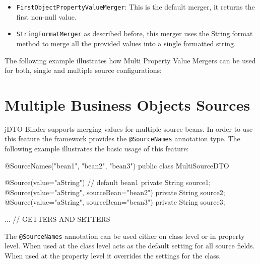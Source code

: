 \documentclass[11pt]{article}
\newcommand{\JDTO}{jDTO Binder\xspace}
\begin{document}
\begin{itemize}
 \item \texttt{FirstObjectPropertyValueMerger}: This is the default merger, it returns the first non-null value.
 \item \texttt{StringFormatMerger} as described before, this merger uses the String.format method to merge all the provided values into a single formatted string.
\end{itemize}


The following example illustrates how Multi Property Value Mergers can be used for both, single and multiple source configurations:




\section{Multiple Business Objects Sources}

\JDTO supports merging values for multiple source beans. In order to use this feature the framework provides the \texttt{@SourceNames} annotation type. The following example illustrates the basic usage of this feature:



\begin{java}
@SourceNames({"bean1", "bean2", "bean3"})
public class MultiSourceDTO {
    
    @Source(value="aString") // default bean1
    private String source1;
    @Source(value="aString", sourceBean="bean2")
    private String source2;
    @Source(value="aString", sourceBean="bean3")
    private String source3;
    
    ... // GETTERS AND SETTERS
}
\end{java}

The \texttt{@SourceNames} annotation can be used either on class level or in property level. When used at the class level acts as the default setting for all source fields. When used at the property level it overrides the settings for the class.
\end{document}
